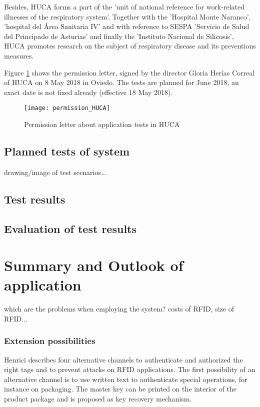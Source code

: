 Besides, HUCA forms a part of the 'unit of national reference for work-related illnesses of the respiratory system'. Together with the 'Hospital Monte Naranco', 'hospital del Área Sanitaria IV' and with reference to \ac{SESPA} 'Servicio de Salud del Principado de Asturias' and finally the 'Instituto Nacional de Silicosis', HUCA promotes research on the subject of respiratory disease and its preventions measures.

Figure \ref{fig:permission} shows the permission letter, signed by the director Gloria Herías Correal of HUCA on 8 May 2018 in Oviedo.
The tests are planned for June 2018, an exact date is not fixed already (effective 18 May 2018). 

\begin{figure}
\centering
\texttt{[image: permission\_HUCA]} 
\caption{\label{fig:permission}Permission letter about application tests in HUCA} 
\end{figure}

\subsection{Planned tests of system}

drawing/image of test scenarios...

\subsection{Test results}

\subsection{Evaluation of test results}

\section{Summary and Outlook of application}

which are the problems when employing the system? 
costs of RFID, size of RFID...

\subsubsection{Extension possibilities}

Henrici \cite[p.121 ff.]{henrici} describes four alternative channels to authenticate and authorized the right tags and to prevent attacks on RFID applications. 
The first possibility of an alternative channel is to use written text to authenticate special operations, for instance on packaging. The master key can be printed on the interior of the product package and is proposed as key recovery mechanism.

